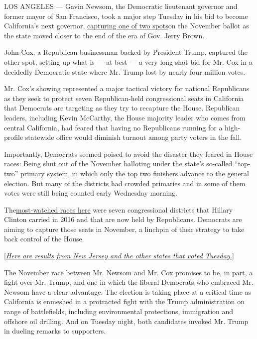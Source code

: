 LOS ANGELES --- Gavin Newsom, the Democratic lieutenant governor and
former mayor of San Francisco, took a major step Tuesday in his bid to
become California's next governor,
\href{https://vote.sos.ca.gov/returns/governor}{capturing one of two
spots}on the November ballot as the state moved closer to the end of the
era of Gov. Jerry Brown.

John Cox, a Republican businessman backed by President Trump, captured
the other spot, setting up what is --- at best --- a very long-shot bid
for Mr. Cox in a decidedly Democratic state where Mr. Trump lost by
nearly four million votes.

Mr. Cox's showing represented a major tactical victory for national
Republicans as they seek to protect seven Republican-held congressional
seats in California that Democrats are targeting as they try to
recapture the House. Republican leaders, including Kevin McCarthy, the
House majority leader who comes from central California, had feared that
having no Republicans running for a high-profile statewide office would
diminish turnout among party voters in the fall.

Importantly, Democrats seemed poised to avoid the disaster they feared
in House races: Being shut out of the November balloting under the
state's so-called ``top-two'' primary system, in which only the top two
finishers advance to the general election. But many of the districts had
crowded primaries and in some of them votes were still being counted
early Wednesday morning.

The\href{https://www.nytimes3xbfgragh.onion/interactive/2018/06/01/us/elections/california-house-primary.html}{most-watched
races here} were seven congressional districts that Hillary Clinton
carried in 2016 and that are now held by Republicans. Democrats are
aiming to capture those seats in November, a linchpin of their strategy
to take back control of the House.

{[}\emph{\href{https://www.nytimes3xbfgragh.onion/2018/06/05/us/politics/primary-elections-new-jersey.html}{Here
are results from New Jersey and the other states that voted
Tuesday.}}{]}

The November race between Mr. Newsom and Mr. Cox promises to be, in
part, a fight over Mr. Trump, and one in which the liberal Democrats who
embraced Mr. Newsom have a clear advantage. The election is taking place
at a critical time as California is enmeshed in a protracted fight with
the Trump administration on range of battlefields, including
environmental protections, immigration and offshore oil drilling. And on
Tuesday night, both candidates invoked Mr. Trump in dueling remarks to
supporters.

